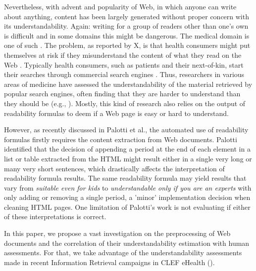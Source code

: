 \documentclass[runningheads,a4paper]{llncs}
\begin{document}
Nevertheless, with advent and popularity of Web, in which anyone can write about anything, content has been largely generated without proper concern with its understandability.
Again: writing for a group of readers other than one's own is difficult and in some domains this might be dangerous.
The medical domain is one of such \cite{}.
The problem, as reported by X, is that health consumers might put themselves at risk if they misunderstand the content of what they read on the Web \cite{}.
Typically health consumers, such as patients and their next-of-kin, start their searches through commercial search engines \cite{}.
Thus, researchers in various areas of medicine have assessed the understandability of the material retrieved by popular search engines, often finding that they are harder to understand than they should be (e.g., \cite{graber99readability,fitzsimmons2010readability,wiener2013readability,patel13readability,atcherson14readability,meillier17readability}).
Mostly, this kind of research also relies on the output of readability formulas to deem if a Web page is easy or hard to understand.

However, as recently discussed in Palotti et al.\cite{palotti15}, the automated use of readability formulas firstly requires the content extraction from Web documents.
Palotti identified that the decision of appending a period at the end of each element in a list or table extracted from the HTML might result either in a single very long or many very short sentences, 
which drastically affects the interpretation of readability formula results. The same readability formula may yield results that vary from \textit{suitable even for kids} to \textit{understandable only if you are an experts} with only adding or removing a single period, a 'minor' implementation decision when cleaning HTML pages. 
One limitation of Palotti's work is not evaluating if either of these interpretations is correct.

In this paper, we propose a vast investigation on the preprocessing of Web documents and the correlation of their understandability estimation with human assessments.
For that, we take advantage of the understandability assessments made in recent Information Retrieval campaigns in CLEF eHealth (\cite{clef15,clef16}).
\end{document}
